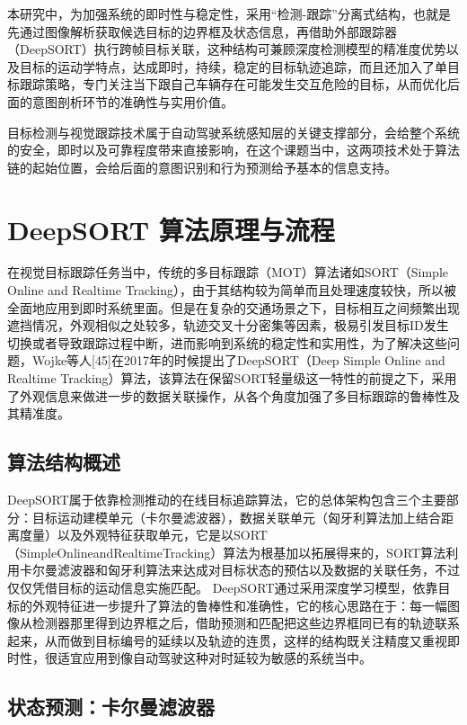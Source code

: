 本研究中，为加强系统的即时性与稳定性，采用“检测-跟踪”分离式结构，也就是先通过图像解析获取候选目标的边界框及状态信息，再借助外部跟踪器（DeepSORT）执行跨帧目标关联，这种结构可兼顾深度检测模型的精准度优势以及目标的运动学特点，达成即时，持续，稳定的目标轨迹追踪，而且还加入了单目标跟踪策略，专门关注当下跟自己车辆存在可能发生交互危险的目标，从而优化后面的意图剖析环节的准确性与实用价值。

目标检测与视觉跟踪技术属于自动驾驶系统感知层的关键支撑部分，会给整个系统的安全，即时以及可靠程度带来直接影响，在这个课题当中，这两项技术处于算法链的起始位置，会给后面的意图识别和行为预测给予基本的信息支持。

\section{DeepSORT 算法原理与流程}

在视觉目标跟踪任务当中，传统的多目标跟踪（MOT）算法诸如SORT（Simple Online and Realtime Tracking），由于其结构较为简单而且处理速度较快，所以被全面地应用到即时系统里面。但是在复杂的交通场景之下，目标相互之间频繁出现遮挡情况，外观相似之处较多，轨迹交叉十分密集等因素，极易引发目标ID发生切换或者导致跟踪过程中断，进而影响到系统的稳定性和实用性，为了解决这些问题，Wojke等人[45]在2017年的时候提出了DeepSORT（Deep Simple Online and Realtime Tracking）算法，该算法在保留SORT轻量级这一特性的前提之下，采用了外观信息来做进一步的数据关联操作，从各个角度加强了多目标跟踪的鲁棒性及其精准度。

\subsection{算法结构概述}

DeepSORT属于依靠检测推动的在线目标追踪算法，它的总体架构包含三个主要部分：目标运动建模单元（卡尔曼滤波器），数据关联单元（匈牙利算法加上结合距离度量）以及外观特征获取单元，它是以SORT（SimpleOnlineandRealtimeTracking）算法为根基加以拓展得来的，SORT算法利用卡尔曼滤波器和匈牙利算法来达成对目标状态的预估以及数据的关联任务，不过仅仅凭借目标的运动信息实施匹配。 DeepSORT通过采用深度学习模型，依靠目标的外观特征进一步提升了算法的鲁棒性和准确性，它的核心思路在于：每一幅图像从检测器那里得到边界框之后，借助预测和匹配把这些边界框同已有的轨迹联系起来，从而做到目标编号的延续以及轨迹的连贯，这样的结构既关注精度又重视即时性，很适宜应用到像自动驾驶这种对时延较为敏感的系统当中。

\subsection{状态预测：卡尔曼滤波器}

